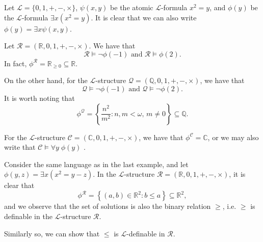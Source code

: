 \documentclass[notoc,notitlepage]{tufte-book}
\begin{document}
\begin{eg}
  Let $\mathcal{L} = \{ 0, 1, +, -, \times \}$, $\psi(x, y)$ be the atomic $\mathcal{L}$-formula $x^2 = y$, and $\phi(y)$ be the $\mathcal{L}$-formula $\exists x (x^2 = y)$. It is clear that we can also write $\phi(y) = \exists x \psi(x, y)$.

  Let $\mathcal{R} = (\mathbb{R}, 0, 1, +, -, \times)$. We have that
  \begin{equation*}
    \mathcal{R} \models \neg \phi(-1) \text{ and } \mathcal{R} \models \phi(2).
  \end{equation*}
  In fact, $\phi^\mathcal{R} = \mathbb{R}_{\geq 0} \subseteq \mathbb{R}$.

  On the other hand, for the $\mathcal{L}$-structure $\mathcal{Q} = (\mathbb{Q}, 0, 1, +, -, \times)$, we have that
  \begin{equation*}
    \mathcal{Q} \models \neg \phi(-1) \text{ and } \mathcal{Q} \models \neg \phi(2).
  \end{equation*}
  It is worth noting that
  \begin{equation*}
    \phi^\mathcal{Q} = \left\{ \frac{n^2}{m^2} : n, m < \omega, \, m \neq 0 \right\} \subseteq \mathbb{Q}.
  \end{equation*}

  For the $\mathcal{L}$-structure $\mathcal{C} = (\mathbb{C}, 0, 1, +, -, \times)$, we have that $\phi^\mathcal{C} = \mathbb{C}$, or we may also write that $\mathcal{C} \models \forall y \; \phi (y)$ .
\end{eg}

\begin{eg}
  Consider the same language as in the last example, and let $\phi(y, z) = \exists x (x^2 = y - z)$. In the $\mathcal{L}$-structure $\mathcal{R} = (\mathbb{R}, 0, 1, +, -, \times)$, it is clear that
  \begin{equation*}
    \phi^\mathcal{R} = \left\{ (a, b) \in \mathbb{R}^2 : b \leq a \right\} \subseteq \mathbb{R}^2,
  \end{equation*}
  and we observe that the set of solutions is also the binary relation $\geq$, i.e. $\geq$ is definable in the $\mathcal{L}$-structure $\mathcal{R}$.

  Similarly so, we can show that $\leq$ is $\mathcal{L}$-definable in $\mathcal{R}$. 
\end{eg}
\end{document}
